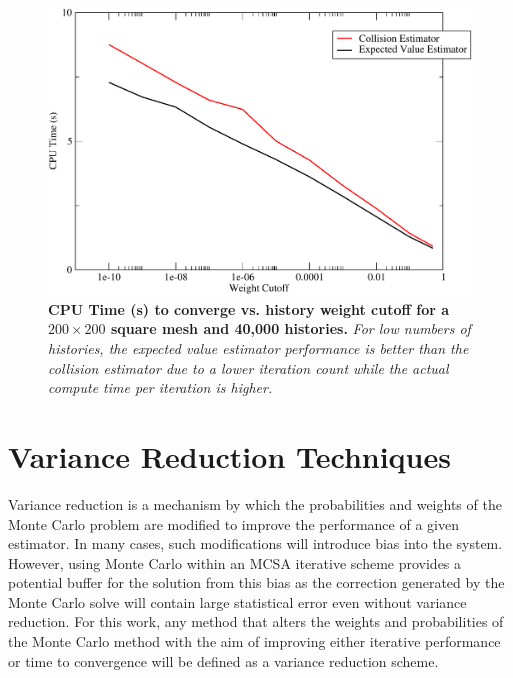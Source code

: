 \begin{figure}[t!]
  \centering
  \includegraphics[width=6in,clip]{chapters/mc_background/estimator_wc_time.pdf}
  \caption{\textbf{CPU Time (s) to converge vs. history weight cutoff
      for a $200 \times 200$ square mesh and 40,000 histories.}
    \textit{For low numbers of histories, the expected value estimator
      performance is better than the collision estimator due to a
      lower iteration count while the actual compute time per
      iteration is higher.}}
  \label{fig:estimator_wc_time}
\end{figure}

\clearpage

\section{Variance Reduction Techniques}
\label{sec:variance_reduction}
Variance reduction is a mechanism by which the probabilities and
weights of the Monte Carlo problem are modified to improve the
performance of a given estimator. In many cases, such modifications
will introduce bias into the system. However, using Monte Carlo within
an MCSA iterative scheme provides a potential buffer for the solution
from this bias as the correction generated by the Monte Carlo solve
will contain large statistical error even without variance
reduction. For this work, any method that alters the weights and
probabilities of the Monte Carlo method with the aim of improving
either iterative performance or time to convergence will be defined as
a variance reduction scheme.

